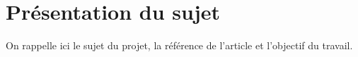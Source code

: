 \chapter{Présentation du sujet}
On rappelle ici le sujet du projet, la référence de l'article et l'objectif du travail.
